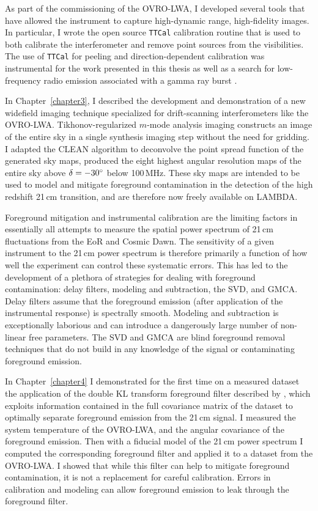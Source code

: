 \begin{bibunit}
As part of the commissioning of the OVRO-LWA, I developed several tools that have allowed the
instrument to capture high-dynamic range, high-fidelity images.  In particular, I wrote the open
source \texttt{TTCal} calibration routine that is used to both calibrate the interferometer and
remove point sources from the visibilities. The use of \texttt{TTCal} for peeling and
direction-dependent calibration was instrumental for the work presented in this thesis as well as a
search for low-frequency radio emission associated with a gamma ray burst
\citep{2017arXiv171106665A}.

In Chapter~\ref{chapter3}, I described the development and demonstration of a new widefield imaging
technique specialized for drift-scanning interferometers like the OVRO-LWA. Tikhonov-regularized
$m$-mode analysis imaging constructs an image of the entire sky in a single synthesis imaging step
without the need for gridding. I adapted the CLEAN algorithm to deconvolve the point spread function
of the generated sky maps, produced the eight highest angular resolution maps of the entire sky
above $\delta=-30\mbox{$^\circ$}$ below 100\,MHz. These sky maps are intended to be used to model and
mitigate foreground contamination in the detection of the high redshift 21\,cm transition, and are
therefore now freely available on LAMBDA.

Foreground mitigation and instrumental calibration are the limiting factors in essentially all
attempts to measure the spatial power spectrum of 21\,cm fluctuations from the EoR and Cosmic Dawn.
The sensitivity of a given instrument to the 21\,cm power spectrum is therefore primarily a function
of how well the experiment can control these systematic errors. This has led to the development of a
plethora of strategies for dealing with foreground contamination: delay filters, modeling and
subtraction, the SVD, and GMCA. Delay filters assume that the foreground emission (after application
of the instrumental response) is spectrally smooth. Modeling and subtraction is exceptionally
laborious and can introduce a dangerously large number of non-linear free parameters. The SVD and
GMCA are blind foreground removal techniques that do not build in any knowledge of the signal or
contaminating foreground emission.

In Chapter~\ref{chapter4} I demonstrated for the first time on a measured dataset the application of
the double KL transform foreground filter described by \citep{2014ApJ...781...57S,
2015PhRvD..91h3514S}, which exploits information contained in the full covariance matrix of the
dataset to optimally separate foreground emission from the 21\,cm signal. I measured the system
temperature of the OVRO-LWA, and the angular covariance of the foreground emission. Then with a
fiducial model of the 21\,cm power spectrum I computed the corresponding foreground filter and
applied it to a dataset from the OVRO-LWA.  I showed that while this filter can help to mitigate
foreground contamination, it is not a replacement for careful calibration. Errors in calibration and
modeling can allow foreground emission to leak through the foreground filter.


\end{bibunit}
